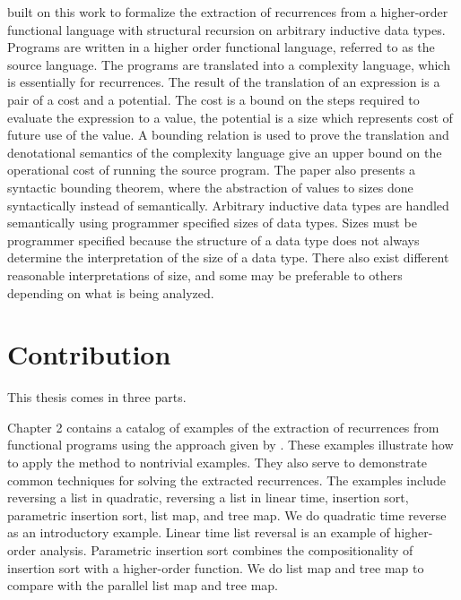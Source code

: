 \citet{Danner2015} built on this work to formalize the extraction
of recurrences from a higher-order functional language with structural
recursion on arbitrary inductive data types. Programs are written in a higher
order functional language, referred to as the source language. The programs are
translated into a complexity language, which is essentially for recurrences.
The result of the translation of an expression is a pair of a cost and a
potential. The cost is a bound on the steps required to evaluate the expression
to a value, the potential is a size which represents cost of future use of the
value. A bounding relation is used to prove the translation and denotational
semantics of the complexity language give an upper bound on the operational
cost of running the source program. The paper also presents a syntactic
bounding theorem, where the abstraction of values to sizes done syntactically
instead of semantically.  Arbitrary inductive data types are handled
semantically using programmer specified sizes of data types. Sizes must be
programmer specified because the structure of a data type does not always
determine the interpretation of the size of a data type. There also exist
different reasonable interpretations of size, and some may be preferable to
others depending on what is being analyzed.


\section{Contribution}

This thesis comes in three parts.



Chapter 2 contains a catalog of examples of the extraction of recurrences
from functional programs using the approach given by \citet{Danner2015}. These
examples illustrate how to apply the method to nontrivial examples. They also
serve to demonstrate common techniques for solving the extracted recurrences.
The examples include reversing a list in quadratic, reversing a list in linear
time, insertion sort, parametric insertion sort, list map, and tree map. We do
quadratic time reverse as an introductory example. Linear time list reversal is
an example of higher-order analysis. Parametric insertion sort combines the
compositionality of insertion sort with a higher-order function. We do list map
and tree map to compare with the parallel list map and tree map.




